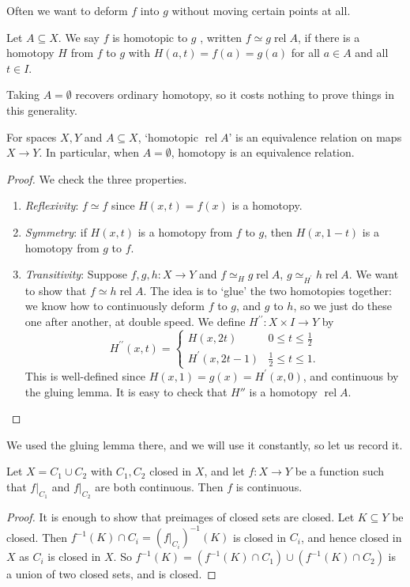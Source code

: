 \documentclass[a4paper]{scrartcl}
\newcommand{\rel}{\operatorname{rel}}
\begin{document}
Often we want to deform $f$ into $g$ without moving certain points at all.

\begin{definition}
	Let $A \subseteq X$. We say $f$ is homotopic to $g$ , written $f \simeq g \rel A$, if there is a homotopy $H$ from $f$ to $g$ with $H(a, t) = f(a) = g(a)$ for all $a \in A$ and all $t \in I$.
\end{definition}

Taking $A = \emptyset$ recovers ordinary homotopy, so it costs nothing to prove things in
this generality.

\begin{proposition}
	For spaces $X, Y$ and $A \subseteq X$, `homotopic $\rel A$' is an equivalence relation on maps $X \to Y$. In particular, when $A = \emptyset$, homotopy is an equivalence relation.
\end{proposition}
\begin{proof}
	We check the three properties.
	\begin{enumerate}
		\item \emph{Reflexivity}: $f \simeq f$ since $H(x, t)=f(x)$ is a homotopy.
		\item \emph{Symmetry}: if $H(x, t)$ is a homotopy from $f$ to $g$, then $H(x, 1-t)$ is a homotopy from $g$ to $f$.
		\item \emph{Transitivity}: Suppose $f, g, h: X \rightarrow Y$ and $f \simeq_H g \rel A$, $g \simeq_{H^{\prime}} h \rel A$. We want to show that $f \simeq h \rel A$. The idea is to `glue' the two homotopies together: we know how to continuously deform $f$ to $g$, and $g$ to $h$, so we just do these one after another, at double speed. We define $H^{\prime \prime}: X \times I \rightarrow Y$ by
		$$
		H^{\prime \prime}(x, t)= \begin{cases}H(x, 2 t) & 0 \leq t \leq \frac{1}{2} \\ H^{\prime}(x, 2 t-1) & \frac{1}{2} \leq t \leq 1.\end{cases}
		$$
		This is well-defined since $H(x, 1)=g(x)=H^{\prime}(x, 0)$, and continuous by the gluing lemma. It is easy to check that $H''$ is a homotopy $\rel A$. \qedhere
	\end{enumerate}
\end{proof}

We used the gluing lemma there, and we will use it constantly, so let us record it.

\begin{lemma}
	Let $X = C_1 \cup C_2$ with $C_1, C_2$ closed in $X$, and let $f: X \to Y$ be a function such that $f|_{C_1}$ and $f|_{C_2}$ are both continuous. Then $f$ is continuous.
\end{lemma}
\begin{proof}
	It is enough to show that preimages of closed sets are closed. Let $K \subseteq Y$ be closed. Then $f^{-1}(K) \cap C_i = (f|_{C_i})^{-1}(K)$ is closed in $C_i$, and hence closed in $X$ as $C_i$ is closed in $X$. So $f^{-1}(K) = (f^{-1}(K) \cap C_1) \cup (f^{-1}(K) \cap C_2)$ is a union of two closed sets, and is closed.
\end{proof}
\end{document}

